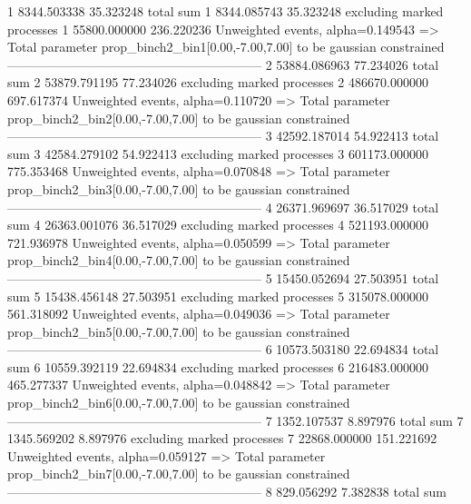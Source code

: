 1          8344.503338     35.323248       total sum                     
1          8344.085743     35.323248       excluding marked processes    
1          55800.000000    236.220236      Unweighted events, alpha=0.149543
  => Total parameter prop_binch2_bin1[0.00,-7.00,7.00] to be gaussian constrained
------------------------------------------------------------
2          53884.086963    77.234026       total sum                     
2          53879.791195    77.234026       excluding marked processes    
2          486670.000000   697.617374      Unweighted events, alpha=0.110720
  => Total parameter prop_binch2_bin2[0.00,-7.00,7.00] to be gaussian constrained
------------------------------------------------------------
3          42592.187014    54.922413       total sum                     
3          42584.279102    54.922413       excluding marked processes    
3          601173.000000   775.353468      Unweighted events, alpha=0.070848
  => Total parameter prop_binch2_bin3[0.00,-7.00,7.00] to be gaussian constrained
------------------------------------------------------------
4          26371.969697    36.517029       total sum                     
4          26363.001076    36.517029       excluding marked processes    
4          521193.000000   721.936978      Unweighted events, alpha=0.050599
  => Total parameter prop_binch2_bin4[0.00,-7.00,7.00] to be gaussian constrained
------------------------------------------------------------
5          15450.052694    27.503951       total sum                     
5          15438.456148    27.503951       excluding marked processes    
5          315078.000000   561.318092      Unweighted events, alpha=0.049036
  => Total parameter prop_binch2_bin5[0.00,-7.00,7.00] to be gaussian constrained
------------------------------------------------------------
6          10573.503180    22.694834       total sum                     
6          10559.392119    22.694834       excluding marked processes    
6          216483.000000   465.277337      Unweighted events, alpha=0.048842
  => Total parameter prop_binch2_bin6[0.00,-7.00,7.00] to be gaussian constrained
------------------------------------------------------------
7          1352.107537     8.897976        total sum                     
7          1345.569202     8.897976        excluding marked processes    
7          22868.000000    151.221692      Unweighted events, alpha=0.059127
  => Total parameter prop_binch2_bin7[0.00,-7.00,7.00] to be gaussian constrained
------------------------------------------------------------
8          829.056292      7.382838        total sum                     
